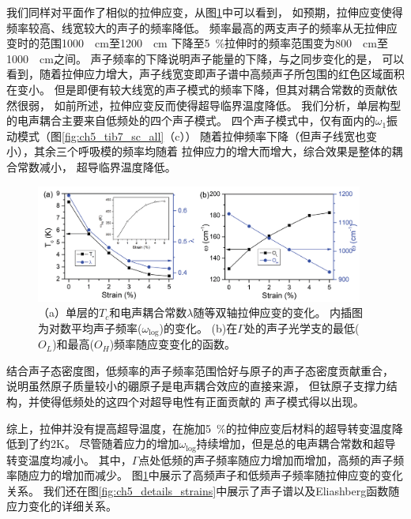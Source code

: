 我们同样对平面作了相似的拉伸应变，从图\ref{fig:ch5_tib7_strain}中可以看到，
如预期，拉伸应变使得频率较高、线宽较大的声子的频率降低。
频率最高的两支声子的频率从无拉伸应变时的范围\SI{1000}{\per\cm}至\SI{1200}{\per\cm}
下降至\SI{5}{\percent}拉伸时的频率范围变为\SI{800}{\per\cm}至\SI{1000}{\per\cm}之间。
声子频率的下降说明声子能量的下降，与之同步变化的是，
可以看到，随着拉伸应力增大，声子线宽变即声子谱中高频声子所包围的红色区域面积在变小。
但是即便有较大线宽的声子模式的频率下降，但其对耦合常数的贡献依然很弱，
如前所述，拉伸应变反而使得超导临界温度降低。
我们分析，单层构型的电声耦合主要来自低频处的四个声子模式。
四个声子模式中，仅有面内的$\omega_1$振动模式（图\ref{fig:ch5_tib7_sc_all}（c））
随着拉伸频率下降（但声子线宽也变小），其余三个呼吸模的频率均随着
拉伸应力的增大而增大，综合效果是整体的耦合常数减小，
超导临界温度降低。

\begin{figure}
  \includegraphics[width=0.96\textwidth]{figs/ch5_tib7_strain.png}
  \centering
  \caption{（a）单层的$T_c$和电声耦合常数$\lambda$随等双轴拉伸应变的变化。
  内插图为对数平均声子频率($\omega_{\mathrm{log}}$)的变化。
  (b)在$\Gamma$处的声子光学支的最低($O_L$)和最高($O_H$)频率随应变变化的函数。}
  \label{fig:ch5_tib7_strain}
\end{figure}

结合声子态密度图，低频率的声子频率范围恰好与原子的声子态密度贡献重合，
说明虽然原子质量较小的硼原子是电声耦合效应的直接来源，
但钛原子支撑力结构，并使得低频处的这四个对超导电性有正面贡献的
声子模式得以出现。

综上，拉伸并没有提高超导温度，在施加\SI{5}{\percent}的拉伸应变后材料的超导转变温度降低到了约2K。
尽管随着应力的增加$\omega_\mathrm{log}$持续增加，但是总的电声耦合常数和超导转变温度均减小。
其中，$\Gamma$点处低频的声子频率随应力增加而增加，高频的声子频率随应力的增加而减少。
图\ref{fig:ch5_tib7_strain}中展示了高频声子和低频声子频率随拉伸应变的变化关系。
我们还在图\ref{fig:ch5_details_strains}中展示了声子谱以及Eliashberg函数随应力变化的详细关系。

